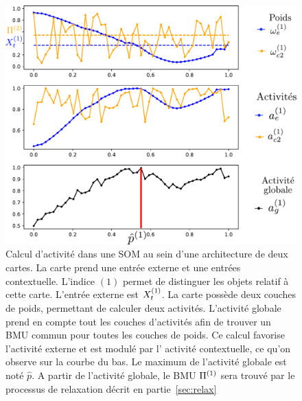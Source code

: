 \begin{figure}
\begin{minipage}{0.6\textwidth}
\centering
\includegraphics[width=\textwidth]{activite_layers_2maps.pdf}
\end{minipage}
\hfill
\begin{minipage}{0.35\textwidth}
\caption{Calcul d'activité dans une SOM au sein d'une architecture de deux cartes. La carte prend une entrée externe et une entrées contextuelle. L'indice $(1)$ permet de distinguer les objets relatif à cette carte. L'entrée externe est $X^{({1})}_t$. La carte possède deux couches de poids, permettant de calculer deux activités. L'activité globale prend en compte tout les couches d'activités afin de trouver un BMU commun pour toutes les couches de poids. Ce calcul favorise l'activité externe et est modulé par l' activité contextuelle, ce qu'on observe sur la courbe du bas. Le maximum de l'activité globale est noté $\hat{p}$. A partir de l'activité globale, le BMU $\Pi^{({1})}$ sera trouvé par le processus de relaxation décrit en partie~\ref{sec:relax}\label{fig:2som_activite}}
\end{minipage}

\end{figure}


